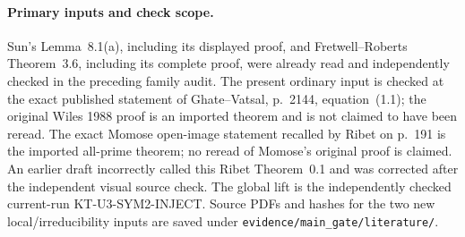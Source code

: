 \paragraph{Primary inputs and check scope.}
Sun's Lemma~8.1(a), including its displayed proof, and
Fretwell--Roberts Theorem~3.6, including its complete proof,
were already read and independently checked in the preceding
family audit. The present ordinary input is checked at the
exact published statement of Ghate--Vatsal, p.~2144,
equation~(1.1); the original Wiles 1988 proof is an imported
theorem and is not claimed to have been reread. The exact
Momose open-image statement recalled by Ribet on p.~191
is the imported all-prime theorem; no reread of Momose's
original proof is claimed. An earlier draft incorrectly
called this Ribet Theorem~0.1 and was corrected after the
independent visual source check. The global lift is the independently
checked current-run KT-U3-SYM2-INJECT. Source PDFs and
hashes for the two new local/irreducibility inputs are
saved under \texttt{evidence/main\_gate/literature/}.
